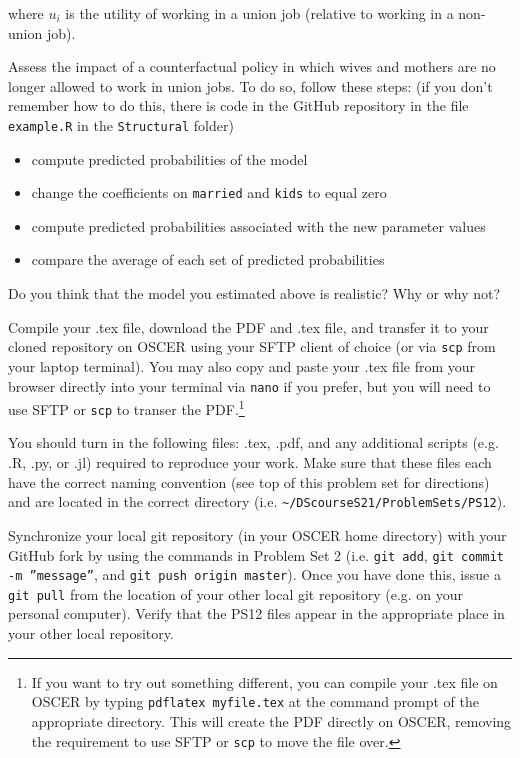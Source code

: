 \documentclass[12pt,english]{exam}
\begin{document}
\begin{questions}
where $u_{i}$ is the utility of working in a union job (relative to working in a non-union job).

\question Assess the impact of a counterfactual policy in which wives and mothers are no longer allowed to work in union jobs. To do so, follow these steps: (if you don't remember how to do this, there is code in the GitHub repository in the file \texttt{example.R} in the \texttt{Structural} folder)
\begin{itemize}
    \item compute predicted probabilities of the model
    \item change the coefficients on \texttt{married} and \texttt{kids} to equal zero
    \item compute predicted probabilities associated with the new parameter values
    \item compare the average of each set of predicted probabilities
\end{itemize}

Do you think that the model you estimated above is realistic? Why or why not?

\question Compile your .tex file, download the PDF and .tex file, and transfer it to your cloned repository on OSCER using your SFTP client of choice (or via \texttt{scp} from your laptop terminal). You may also copy and paste your .tex file from your browser directly into your terminal via \texttt{nano} if you prefer, but you will need to use SFTP or \texttt{scp} to transer the PDF.\footnote{If you want to try out something different, you can compile your .tex file on OSCER by typing \texttt{pdflatex myfile.tex} at the command prompt of the appropriate directory. This will create the PDF directly on OSCER, removing the requirement to use SFTP or \texttt{scp} to move the file over.}

\question You should turn in the following files: .tex, .pdf, and any additional scripts (e.g. .R, .py, or .jl) required to reproduce your work.  Make sure that these files each have the correct naming convention (see top of this problem set for directions) and are located in the correct directory (i.e. \texttt{\textasciitilde/DScourseS21/ProblemSets/PS12}).

\question Synchronize your local git repository (in your OSCER home directory) with your GitHub fork by using the commands in Problem Set 2 (i.e. \texttt{git add}, \texttt{git commit -m ''message''}, and \texttt{git push origin master}). Once you have done this, issue a \texttt{git pull} from the location of your other local git repository (e.g. on your personal computer). Verify that the PS12 files appear in the appropriate place in your other local repository.

\end{questions}
\end{document}
